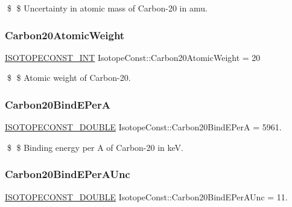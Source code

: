 \$ \$ Uncertainty in atomic mass of Carbon-\/20 in amu. \mbox{\label{group___isotope_const-_carbon-_c20_ga1c06335ffc59ce8f125ef880caa6a0e5}} 
\subsubsection{\texorpdfstring{Carbon20\+Atomic\+Weight}{Carbon20AtomicWeight}}
{\footnotesize\ttfamily \mbox{\hyperlink{group___isotope_const-_macros_ga5f18360b3e99483a35c32d789e62621c}{I\+S\+O\+T\+O\+P\+E\+C\+O\+N\+S\+T\+\_\+\+I\+NT}} Isotope\+Const\+::\+Carbon20\+Atomic\+Weight = 20}

\$ \$ Atomic weight of Carbon-\/20. \mbox{\label{group___isotope_const-_carbon-_c20_ga5415ecbde9dd81f3e3a5df8da26e9b32}} 
\subsubsection{\texorpdfstring{Carbon20\+Bind\+E\+PerA}{Carbon20BindEPerA}}
{\footnotesize\ttfamily \mbox{\hyperlink{group___isotope_const-_macros_ga8f45a7272ce02c0b4c65c44636ed719a}{I\+S\+O\+T\+O\+P\+E\+C\+O\+N\+S\+T\+\_\+\+D\+O\+U\+B\+LE}} Isotope\+Const\+::\+Carbon20\+Bind\+E\+PerA = 5961.}

\$ \$ Binding energy per A of Carbon-\/20 in keV. \mbox{\label{group___isotope_const-_carbon-_c20_ga56c9f8f828d6007b15705d9e3a2c6470}} 
\subsubsection{\texorpdfstring{Carbon20\+Bind\+E\+Per\+A\+Unc}{Carbon20BindEPerAUnc}}
{\footnotesize\ttfamily \mbox{\hyperlink{group___isotope_const-_macros_ga8f45a7272ce02c0b4c65c44636ed719a}{I\+S\+O\+T\+O\+P\+E\+C\+O\+N\+S\+T\+\_\+\+D\+O\+U\+B\+LE}} Isotope\+Const\+::\+Carbon20\+Bind\+E\+Per\+A\+Unc = 11.}

